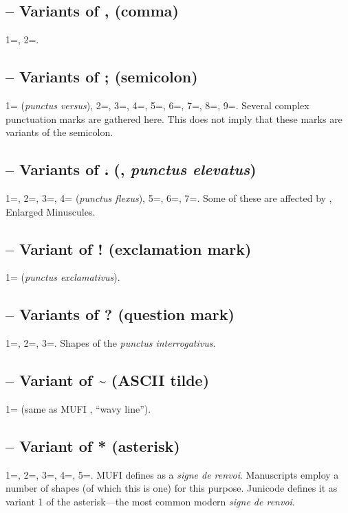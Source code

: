 \subsection{ –
Variants of , (comma)}
1=, 2=.

\subsection{ –
Variants of ; (semicolon)}
1= (\textit{punctus versus}), 2=, 3=, 4=,
5=, 6=, 7=, 8=, 9=. Several complex
punctuation marks are gathered here. This does not imply that these marks are variants of
the semicolon.

\subsection{ – Variants of ⹎ (, \textit{punctus elevatus})}
1=, 2=, 3=, 4= (\textit{punctus flexus}),
5=, 6=, 7=. Some of these are affected by ,
Enlarged Minuscules.

\subsection{ – Variant of ! (exclamation mark)}
1= (\textit{punctus exclamativus}).

\subsection{
– Variants of ? (question mark)}
1=, 2=, 3=. Shapes of the \textit{punctus interrogativus}.

\subsection{
– Variant of \~{} (ASCII tilde)}
1= (same as MUFI , “wavy line”).

\subsection{ –
Variant of * (asterisk)}
1=, 2=, 3=, 4=, 5=.
MUFI defines  as a \textit{signe de renvoi}. Manuscripts employ a number of shapes (of which this is one) for
this purpose. Junicode defines it as variant 1 of the asterisk—the most common modern \textit{signe de renvoi}.

